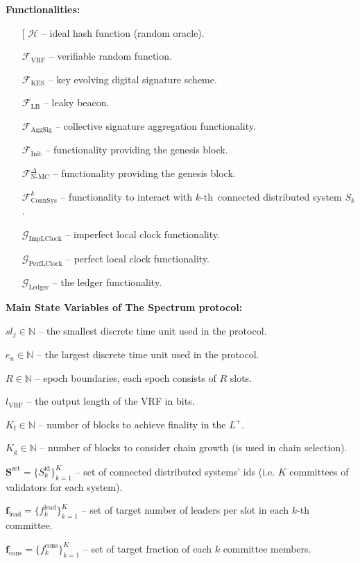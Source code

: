 \textbf{Functionalities:}
\begin{itemize}
    \item[\fontencoding[\ding{113}] $\mathcal{H}$ -- ideal hash function (random oracle).
    \item[\ding{113}] $\mathcal{F}_{\text{VRF}}$ -- verifiable random function.
    \item[\ding{113}] $\mathcal{F}_{\text{KES}}$ -- key evolving digital signature scheme.
    \item[\ding{113}] $\mathcal{F}_{\text{LB}}$ -- leaky beacon.
    \item[\ding{113}] $\mathcal{F}_{\text{AggSig}}$ -- collective signature aggregation functionality.
    \item[\ding{113}] $\mathcal{F}_{\text{Init}}$ -- functionality providing the genesis block.
    \item[\ding{113}] $\mathcal{F}^{\Delta}_{\text{N-MC}}$ -- functionality providing the genesis block.
    \item[\ding{113}] $\mathcal{F}^k_{\text{ConnSys}}$ -- functionality to interact with $k$-th\
    connected distributed system $S_k$.
    \item[\ding{113}] $\mathcal{G}_{\text{ImpLClock}}$ -- imperfect local clock functionality.
    \item[\ding{113}] $\mathcal{G}_{\text{PerfLClock}}$ -- perfect local clock functionality.
    \item[\ding{113}] $\mathcal{G}_{\text{Ledger}}$ -- the ledger functionality.

\end{itemize}
\bigbreak

\noindent
\textbf{Main State Variables of The Spectrum protocol:}
\begin{legal}
    \item[\ding{113}] $sl_j \in \mathbb{N}$ -- the smallest discrete time unit used in the protocol.
    \item[\ding{113}] $e_n \in \mathbb{N}$ -- the largest discrete time unit used in the protocol.
    \item[\ding{113}] $R \in \mathbb{N}$ -- epoch boundaries, each epoch consists of $R$ slots.
    \item[\ding{113}] $l_{\text{VRF}}$ -- the output length of the VRF in bits.
    \item[\ding{113}] $K_{\text{f}} \in \mathbb{N}$ -- number of blocks to achieve finality in the $L^+$.
    \item[\ding{113}] $K_{\text{g}} \in \mathbb{N}$ -- number of blocks to consider chain growth (is used in chain selection).
    \item[\ding{113}] $\mathbf{S}^{\text{set}} = \{S_k^{\text{id}}\}_{k=1}^K$ -- set of connected distributed systems' ids (i.e. $K$ committees of validators for each system).
    \item[\ding{113}] $\mathbf{f}_{\text{lead}} = \{f^{\text{lead}}_k\}_{k=1}^K$ -- set of target number of leaders per slot in each $k$-th committee.
    \item[\ding{113}] $\mathbf{f}_{\text{cons}} = \{f^{\text{cons}}_k\}_{k=1}^K$ -- set of target fraction of each $k$ committee members.
\end{legal}
\bigbreak

